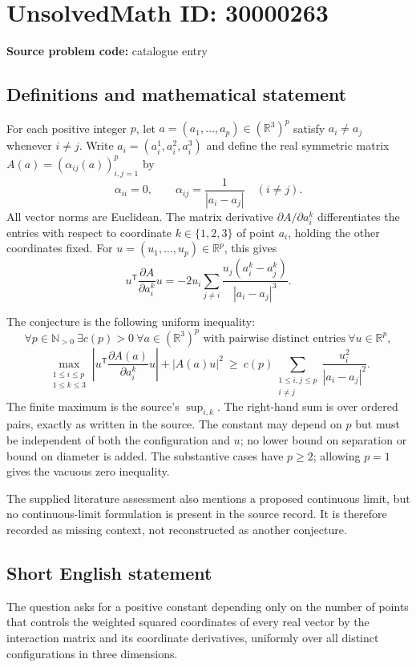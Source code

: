 \documentclass[11pt]{article}
\newcommand{\N}{\mathbb{N}}
\newcommand{\R}{\mathbb{R}}
\begin{document}
\section*{UnsolvedMath ID: 30000263}
\textbf{Source problem code:} catalogue entry
\subsection{Definitions and mathematical statement}
For each positive integer $p$, let $a=(a_1,\ldots,a_p)\in(\R^3)^p$ satisfy $a_i\ne a_j$ whenever $i\ne j$. Write $a_i=(a_i^1,a_i^2,a_i^3)$ and define the real symmetric matrix $A(a)=(\alpha_{ij}(a))_{i,j=1}^p$ by
\[
 \alpha_{ii}=0,\qquad \alpha_{ij}=\frac1{|a_i-a_j|}\quad(i\ne j).
\]
All vector norms are Euclidean. The matrix derivative $\partial A/\partial a_i^k$ differentiates the entries with respect to coordinate $k\in\{1,2,3\}$ of point $a_i$, holding the other coordinates fixed. For $u=(u_1,\ldots,u_p)\in\R^p$, this gives
\[
 u^{\mathsf T}\frac{\partial A}{\partial a_i^k}u
 =-2u_i\sum_{j\ne i}\frac{u_j(a_i^k-a_j^k)}{|a_i-a_j|^3}.
\]

The conjecture is the following uniform inequality:
\[
 \forall p\in\N_{>0}\ \exists c(p)>0\ \forall a\in(\R^3)^p
 \text{ with pairwise distinct entries}\ \forall u\in\R^p,
\]
\[
 \max_{\substack{1\le i\le p\\1\le k\le3}}
 \left|u^{\mathsf T}\frac{\partial A(a)}{\partial a_i^k}u\right|
 +|A(a)u|^2
 \ \ge\ c(p)\sum_{\substack{1\le i,j\le p\\i\ne j}}
 \frac{u_i^2}{|a_i-a_j|^2}.
\]
The finite maximum is the source's $\sup_{i,k}$. The right-hand sum is over ordered pairs, exactly as written in the source. The constant may depend on $p$ but must be independent of both the configuration and $u$; no lower bound on separation or bound on diameter is added. The substantive cases have $p\ge2$; allowing $p=1$ gives the vacuous zero inequality.

The supplied literature assessment also mentions a proposed continuous limit, but no continuous-limit formulation is present in the source record. It is therefore recorded as missing context, not reconstructed as another conjecture.
\subsection{Short English statement}
The question asks for a positive constant depending only on the number of points that controls the weighted squared coordinates of every real vector by the interaction matrix and its coordinate derivatives, uniformly over all distinct configurations in three dimensions.
\end{document}
